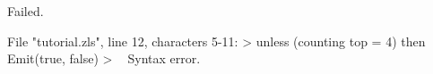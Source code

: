\runverbatimfalse
{}
\begin{RunVerbatimMsg}
Failed.
\end{RunVerbatimMsg}
\begin{RunVerbatimErr}
File "tutorial.zls", line 12, characters 5-11:
>     unless (counting top = 4) then Emit(true, false)
>     ^^^^^^
Syntax error.
\end{RunVerbatimErr}
